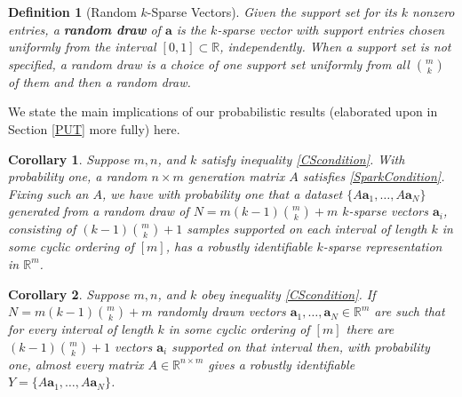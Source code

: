\documentclass[journal, onecolumn]{IEEEtran}
\newtheorem{definition}{Definition}
\newtheorem{corollary}{Corollary}
\begin{document}
\begin{definition}[Random $k$-Sparse Vectors]\label{RandomDraw}
Given the support set for its $k$ nonzero entries, a \textbf{random draw} of $\mathbf{a}$ is the $k$-sparse vector with support entries chosen uniformly from the interval $[0, 1] \subset \mathbb{R}$, independently. When a support set is not specified, a random draw is a choice of one support set uniformly from all ${m \choose k}$ of them and then a random draw.
\end{definition}

We state the main implications of our probabilistic results (elaborated upon in Section \ref{PUT} more fully) here. %

\begin{corollary}
Suppose $m, n$, and $k$ satisfy inequality \eqref{CScondition}. With probability one, a random $n \times m$ generation matrix $A$ satisfies \eqref{SparkCondition}. Fixing such an $A$, we have with probability one that a dataset $\{A\mathbf{a}_1, \ldots , A\mathbf{a}_N\}$ generated from a random draw of $N = m(k-1){m \choose k}+m$ $k$-sparse vectors $\mathbf{a}_i$, consisting of $(k-1){m \choose k}+1$ samples supported on each interval of length $k$ in some cyclic ordering of $[m]$, has a robustly identifiable $k$-sparse representation in $\mathbb{R}^m$.
\end{corollary}

\begin{corollary}
Suppose $m, n$, and $k$ obey inequality \eqref{CScondition}.  If $N = m(k-1){m \choose k}+m$ randomly drawn vectors $\mathbf{a}_1, \ldots, \mathbf{a}_N \in \mathbb{R}^m$ are such that for every interval of length $k$ in some cyclic ordering of $[m]$ there are $(k-1){m \choose k}+1$ vectors $\mathbf{a}_i$ supported on that interval then, with probability one, almost every matrix $A \in \mathbb{R}^{n \times m}$ gives a robustly identifiable $Y = \{A\mathbf{a}_1, \ldots , A\mathbf{a}_N \}$.
\end{corollary}


\end{document}
